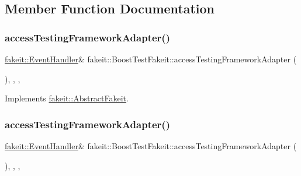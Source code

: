 \subsection{Member Function Documentation}
\mbox{\label{classfakeit_1_1BoostTestFakeit_aa82090202cc88ef0a3e6ca6c3c8786da}} 
\subsubsection{\texorpdfstring{accessTestingFrameworkAdapter()}{accessTestingFrameworkAdapter()}\hspace{0.1cm}{\footnotesize\ttfamily [1/2]}}
{\footnotesize\ttfamily \mbox{\hyperlink{structfakeit_1_1EventHandler}{fakeit\+::\+Event\+Handler}}\& fakeit\+::\+Boost\+Test\+Fakeit\+::access\+Testing\+Framework\+Adapter (\begin{DoxyParamCaption}{ }\end{DoxyParamCaption})\hspace{0.3cm}{\ttfamily [inline]}, {\ttfamily [override]}, {\ttfamily [protected]}, {\ttfamily [virtual]}}



Implements \mbox{\hyperlink{classfakeit_1_1AbstractFakeit_a9476180a503524d49d1978fbbc125b01}{fakeit\+::\+Abstract\+Fakeit}}.

\mbox{\label{classfakeit_1_1BoostTestFakeit_aa82090202cc88ef0a3e6ca6c3c8786da}} 
\subsubsection{\texorpdfstring{accessTestingFrameworkAdapter()}{accessTestingFrameworkAdapter()}\hspace{0.1cm}{\footnotesize\ttfamily [2/2]}}
{\footnotesize\ttfamily \mbox{\hyperlink{structfakeit_1_1EventHandler}{fakeit\+::\+Event\+Handler}}\& fakeit\+::\+Boost\+Test\+Fakeit\+::access\+Testing\+Framework\+Adapter (\begin{DoxyParamCaption}{ }\end{DoxyParamCaption})\hspace{0.3cm}{\ttfamily [inline]}, {\ttfamily [override]}, {\ttfamily [protected]}, {\ttfamily [virtual]}}



